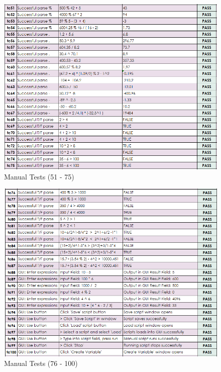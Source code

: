\documentclass[a4paper, oneside, 11pt]{report}
\begin{document}
\begin{figure}[H]
    \centering
    \includegraphics[width=16.0cm]{MathChampTestPlan-C.png}
    \caption{Manual Tests (51 - 75)}
    \label{fig:tests51-75}
\end{figure}
\newpage

\begin{figure}[H]
    \centering
    \includegraphics[width=16.0cm]{MathChampTestPlan-D.png}
    \caption{Manual Tests (76 - 100)}
    \label{fig:tests76 - 100}
\end{figure}
\newpage
\end{document}
